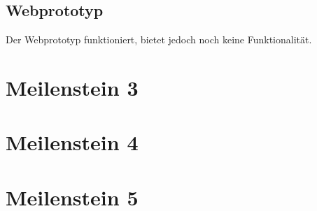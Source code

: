 \documentclass[ngerman, 12pt, pdftex]{scrartcl}[2006/07/30]
\begin{document}
\subsection{Webprototyp}
Der Webprototyp funktioniert, bietet jedoch noch keine Funktionalität.




\newpage
\section{Meilenstein 3}

\newpage
\section{Meilenstein 4}

\newpage
\section{Meilenstein 5}
\end{document}
